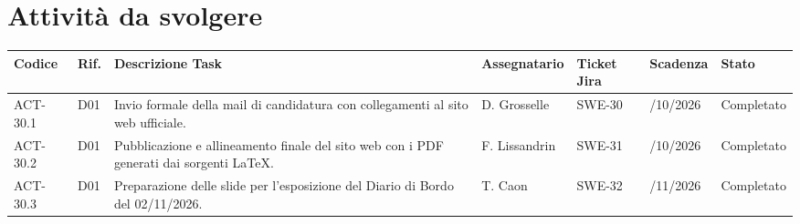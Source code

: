 \newpage

\section{Attività da svolgere}

\renewcommand{\arraystretch}{1.3}
\noindent
{\small\setlength{\tabcolsep}{3pt}%
\begin{tabularx}{\textwidth}{|>{\raggedright\arraybackslash}p{1.75cm}|>{\raggedright\arraybackslash}p{0.75cm}|>{\raggedright\arraybackslash}X|>{\raggedright\arraybackslash}p{2.3cm}|>{\raggedright\arraybackslash}p{1.35cm}|>{\raggedright\arraybackslash}p{1.8cm}|>{\raggedright\arraybackslash}p{1.85cm}|}
    \hline
    \textbf{Codice} & \textbf{Rif.} & \textbf{Descrizione Task} & \textbf{Assegnatario} & \textbf{Ticket Jira} & \textbf{Scadenza} & \textbf{Stato} \\
    \hline
    ACT-30.1 & D01 & Invio formale della mail di candidatura con collegamenti al sito web ufficiale. & D. Grosselle & SWE-30 & 30/10/2026 & Completato \\
    \hline
    ACT-30.2 & D01 & Pubblicazione e allineamento finale del sito web con i PDF generati dai sorgenti LaTeX. & F. Lissandrin & SWE-31 & 30/10/2026 & Completato \\
    \hline
    ACT-30.3 & D01 & Preparazione delle slide per l'esposizione del Diario di Bordo del 02/11/2026. & T. Caon & SWE-32 & 01/11/2026 & Completato \\
    \hline
\end{tabularx}}
